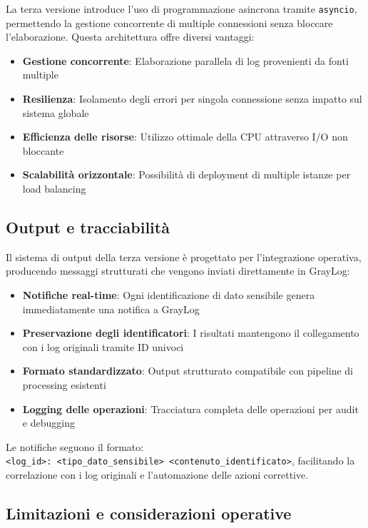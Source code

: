 \documentclass[12pt]{report}
\begin{document}
La terza versione introduce l'uso di programmazione asincrona tramite \texttt{asyncio}, permettendo la gestione concorrente di multiple connessioni senza bloccare l'elaborazione. Questa architettura offre diversi vantaggi:

\begin{itemize}
    \item \textbf{Gestione concorrente}: Elaborazione parallela di log provenienti da fonti multiple
    \item \textbf{Resilienza}: Isolamento degli errori per singola connessione senza impatto sul sistema globale
    \item \textbf{Efficienza delle risorse}: Utilizzo ottimale della CPU attraverso I/O non bloccante
    \item \textbf{Scalabilità orizzontale}: Possibilità di deployment di multiple istanze per load balancing
\end{itemize}

\subsection{Output e tracciabilità}
\label{subsec:ver3_output}

Il sistema di output della terza versione è progettato per l'integrazione operativa, producendo messaggi strutturati che vengono inviati direttamente in GrayLog:

\begin{itemize}
    \item \textbf{Notifiche real-time}: Ogni identificazione di dato sensibile genera immediatamente una notifica a GrayLog
    \item \textbf{Preservazione degli identificatori}: I risultati mantengono il collegamento con i log originali tramite ID univoci
    \item \textbf{Formato standardizzato}: Output strutturato compatibile con pipeline di processing esistenti
    \item \textbf{Logging delle operazioni}: Tracciatura completa delle operazioni per audit e debugging
\end{itemize}

Le notifiche seguono il formato: \\
\texttt{<log\_id>: <tipo\_dato\_sensibile> <contenuto\_identificato>}, facilitando la correlazione con i log originali e l'automazione delle azioni correttive.

\subsection{Limitazioni e considerazioni operative}
\label{subsec:ver3_limitazioni}
\end{document}
